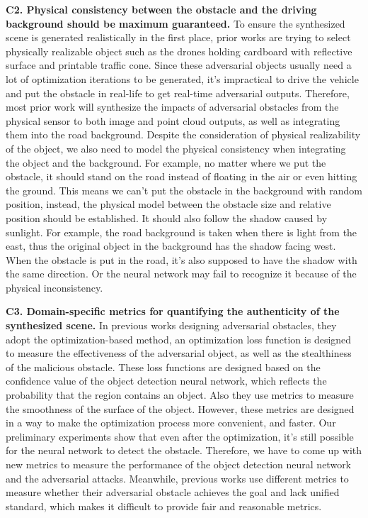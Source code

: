 \textbf{C2. Physical consistency between the obstacle and the driving background should be maximum guaranteed.} 
To ensure the synthesized scene is generated realistically in the first place, 
prior works are trying to select physically realizable object such as the drones holding cardboard with reflective surface\cite{25} and printable traffic cone\cite{msf-adv}.
Since these adversarial objects usually need a lot of optimization iterations to be generated, 
it's impractical to drive the vehicle and put the obstacle in real-life to get real-time adversarial outputs.
Therefore, most prior work will synthesize the impacts of adversarial obstacles from the physical sensor to both image and point cloud outputs, as well as integrating them into the road background.
Despite the consideration of physical realizability of the object, we also need to model the physical consistency when integrating the object and the background.
For example, no matter where we put the obstacle, it should stand on the road instead of floating in the air or even hitting the ground. 
This means we can't put the obstacle in the background with random position, instead, the physical model between the obstacle size and relative position should be established.
It should also follow the shadow caused by sunlight. 
For example, the road background is taken when there is light from the east, thus the original object in the background has the shadow facing west.
When the obstacle is put in the road, it's also supposed to have the shadow with the same direction.
Or the neural network may fail to recognize it because of the physical inconsistency.

\textbf{C3. Domain-specific metrics for quantifying the authenticity of the synthesized scene. }
In previous works designing adversarial obstacles, they adopt the optimization-based method,
an optimization loss function is designed to measure the effectiveness of the adversarial object, as well as the stealthiness of the malicious obstacle.
These loss functions are designed based on the confidence value of the object detection neural network, which reflects the probability that the region contains an object\cite{msf-adv}. 
Also they use metrics to measure the smoothness of the surface of the object.
However, these metrics are designed in a way to make the optimization process more convenient, and faster.
Our preliminary experiments show that even after the optimization, it's still possible for the neural network to detect the obstacle.
Therefore, we have to come up with new metrics to measure the performance of the object detection neural network and the adversarial attacks.
Meanwhile, previous works use different metrics to measure whether their adversarial obstacle achieves the goal and lack unified standard, 
which makes it difficult to provide fair and reasonable metrics. 

